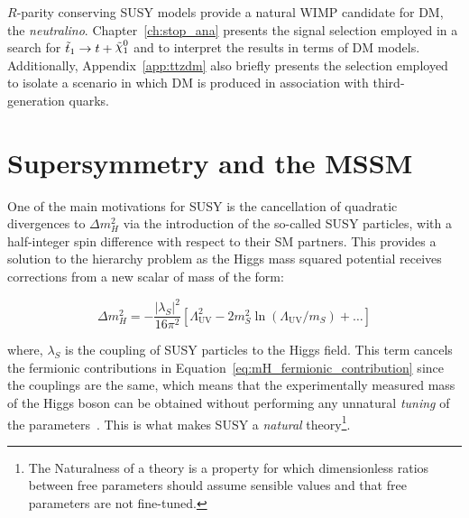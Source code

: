 			$R$-parity conserving \ac{SUSY} models provide a natural \ac{WIMP} candidate for \ac{DM}, the \emph{neutralino}. Chapter~\ref{ch:stop_ana} presents the signal selection employed in a search for $\stopone \ra t + \ninoone$ and to interpret the results in terms of DM models. Additionally, Appendix~\ref{app:ttzdm} also briefly presents the selection employed to isolate a scenario in which \ac{DM} is produced in association with third-generation quarks.  




	\section{Supersymmetry and the MSSM}
	\label{sec:SUSY}	

		One of the main motivations for \ac{SUSY} is the cancellation of quadratic divergences to $\Delta m_H^2$ via the introduction of the so-called \ac{SUSY} particles, with a half-integer spin difference with respect to their \ac{SM} partners. This provides a solution to the hierarchy problem as the Higgs mass squared potential receives corrections from a new scalar of mass of the form:

		\begin{equation}
		\label{eq:mH_scalar_contribution}
			\Delta m_H^2 = - \frac{\left | \lambda_S \right |^2}{16 \pi ^2} \left [  \Lambda_{\mathrm{UV}}^2 - 2m_S^2 \ln \left (\Lambda_{\mathrm{UV}} / m_S \right) + \dots \right ]
		\end{equation}

		\noindent where, $\lambda_S$ is the coupling of \ac{SUSY} particles to the Higgs field. This term cancels the fermionic contributions in Equation~\ref{eq:mH_fermionic_contribution} since the couplings are the same, which means that the experimentally measured mass of the Higgs boson can be obtained without performing any unnatural \emph{tuning} of the parameters~\cite{susyprimer,Barbieri:1987fn}. This is what makes \ac{SUSY} a \emph{natural} theory\footnote{The Naturalness of a theory is a property for which dimensionless ratios between free parameters should assume sensible values and that free parameters are not fine-tuned.}.

